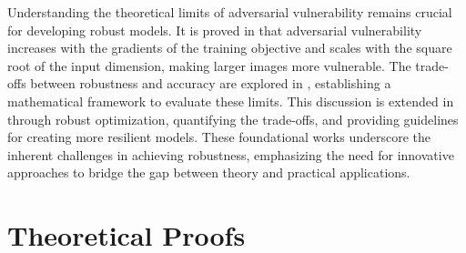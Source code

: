 Understanding the theoretical limits of adversarial vulnerability remains crucial for developing robust models. It is proved in \cite{simon2019first} that adversarial vulnerability increases with the gradients of the training objective and scales with the square root of the input dimension, making larger images more vulnerable. The trade-offs between robustness and accuracy are explored in \cite{fawzi2018adversarial}, establishing a mathematical framework to evaluate these limits. This discussion is extended in \cite{madry2017towards} through robust optimization, quantifying the trade-offs, and providing guidelines for creating more resilient models. These foundational works underscore the inherent challenges in achieving robustness, emphasizing the need for innovative approaches to bridge the gap between theory and practical applications.


\section{Theoretical Proofs}
\label{app:theory}

